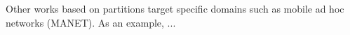 


Other works based on partitions target specific domains such as mobile ad hoc networks (MANET). As an example, ...


